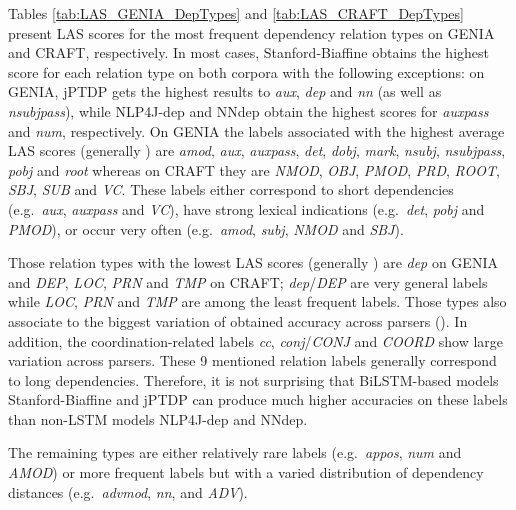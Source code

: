 \documentclass[twocolumn,hyperref]{bmcart}\pdfoutput=1
\begin{document}
Tables \ref{tab:LAS_GENIA_DepTypes} and \ref{tab:LAS_CRAFT_DepTypes} present LAS scores for the most frequent dependency relation types on GENIA and CRAFT, respectively. In most cases, Stanford-Biaffine obtains the highest score for each relation type on both corpora with the following exceptions: on GENIA, jPTDP gets the highest results to \textit{aux}, \textit{dep} and \textit{nn} (as well as \textit{nsubjpass}), while NLP4J-dep and NNdep obtain the highest scores for \textit{auxpass} and \textit{num}, respectively. 
 On GENIA the labels associated with the highest average LAS scores (generally ) are \textit{amod}, \textit{aux}, \textit{auxpass}, \textit{det}, \textit{dobj}, \textit{mark},  \textit{nsubj}, \textit{nsubjpass}, \textit{pobj} and \textit{root} whereas on CRAFT they are \textit{NMOD}, \textit{OBJ}, \textit{PMOD}, \textit{PRD}, \textit{ROOT}, \textit{SBJ}, \textit{SUB} and \textit{VC}. These labels either correspond to short dependencies (e.g.\ \textit{aux}, \textit{auxpass} and \textit{VC}), have strong lexical indications (e.g.\ \textit{det}, \textit{pobj} and \textit{PMOD}), or  occur very often (e.g.\ \textit{amod}, \textit{subj}, \textit{NMOD} and \textit{SBJ}). 

Those relation types with the lowest LAS scores (generally )  are \textit{dep} on GENIA and \textit{DEP}, \textit{LOC}, \textit{PRN} and \textit{TMP} on CRAFT;  \textit{dep}/\textit{DEP} are very general labels while \textit{LOC}, \textit{PRN} and \textit{TMP}  are among the least frequent labels. Those types also associate to the biggest variation of obtained accuracy across parsers (). In addition, the coordination-related labels \textit{cc}, \textit{conj}/\textit{CONJ} and \textit{COORD} show large variation across parsers. These  9  mentioned relation labels  generally correspond to long dependencies. 
Therefore, it is not surprising that BiLSTM-based models Stanford-Biaffine and jPTDP can produce much higher accuracies on these labels than non-LSTM models NLP4J-dep and NNdep.


The remaining types are either relatively rare labels (e.g.\ \textit{appos}, \textit{num} and \textit{AMOD}) or more frequent labels  but with a varied distribution of dependency distances (e.g.\ \textit{advmod}, \textit{nn}, and \textit{ADV}).
\end{document}
